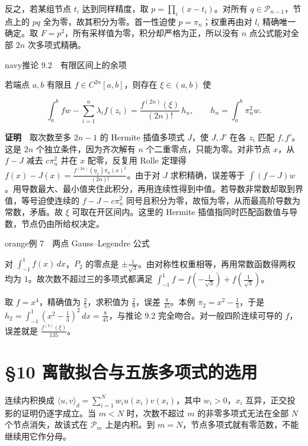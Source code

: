 \documentclass[11pt,a4paper]{article}
\newcommand{\lectureheading}[1]{\section{#1}}
\begin{document}
反之，若某组节点 \(t_i\) 达到同样精度，取 \(p=\prod_i(x-t_i)\)。对所有 \(q\in\mathcal P_{n-1}\)，节点上的 \(pq\) 全为零，故其积分为零。首一性迫使 \(p=\pi_n\)；权重再由对 \(l_i\) 精确唯一确定。取 \(F=p^2\)，所有采样值为零，积分却严格为正，所以没有 \(n\) 点公式能对全部 \(2n\) 次多项式精确。

\begin{sboxenv}{navy}{推论 9.2　有限区间上的余项}

若端点 \(a,b\) 有限且 \(f\in C^{2n}[a,b]\)，则存在 \(\xi\in(a,b)\) 使

\[
\int_a^b fw-\sum_{i=1}^n\lambda_if(z_i)
=\frac{f^{(2n)}(\xi)}{(2n)!}\,h_n,\qquad h_n=\int_a^b\pi_n^2w .
\]

\end{sboxenv}

\textbf{证明}　取次数至多 \(2n-1\) 的 Hermite 插值多项式 \(J\)，使 \(J,J'\) 在各 \(z_i\) 匹配 \(f,f'\)。这是 \(2n\) 个独立条件，因为齐次解有 \(n\) 个二重零点，只能为零。对非节点 \(x\)，从 \(f-J\) 减去 \(c\pi_n^2\) 并在 \(x\) 配零，反复用 Rolle 定理得 \(f(x)-J(x)=\frac{f^{(2n)}(\eta_x)\pi_n(x)^2}{(2n)!}\)。由于对 \(J\) 求积精确，误差等于 \(\int (f-J)w\)。用导数最大、最小值夹住此积分，再用连续性得到中值。若导数非常数却取到界值，等号迫使连续的 \(f-J-c\pi_n^2\) 同号且积分为零，故恒为零，从而最高阶导数为常数，矛盾。故 \(\xi\) 可取在开区间内。这里的 Hermite 插值指同时匹配函数值与导数，节点仍由所给权决定。

\begin{sboxenv}{orange}{例 7　两点 Gauss--Legendre 公式}

对 \(\int_{-1}^{1} f(x)\,dx\)，\(P_2\) 的零点是 \(\pm\frac{1}{\sqrt3}\)。由对称性权重相等，再用常数函数得两权均为 \(1\)。故次数不超过三的多项式都满足 \(\int_{-1}^1 f=f(-\frac{1}{\sqrt3})+f(\frac{1}{\sqrt3})\)。

\end{sboxenv}

取 \(f=x^4\)，精确值为 \(\frac{2}{5}\)，求积值为 \(\frac{2}{9}\)，误差 \(\frac{8}{45}\)。本例 \(\pi_2=x^2-\frac{1}{3}\)，于是 \(h_2=\int_{-1}^1(x^2-\frac{1}{3})^2\,dx=\frac{8}{45}\)，与推论 9.2 完全吻合。对一般四阶连续可导的 \(f\)，误差就是 \(\frac{f^{(4)}(\xi)}{135}\)。

\clearpage\lectureheading{§10 离散拟合与五族多项式的选用}

连续内积换成 \(\langle u,v\rangle_d=\sum_{i=1}^N w_i u(x_i)v(x_i)\)，其中 \(w_i>0\)，\(x_i\) 互异，正交投影的证明仍逐字成立。当 \(m<N\) 时，次数不超过 \(m\) 的非零多项式无法在全部 \(N\) 个节点消失，故该式在 \(\mathcal P_m\) 上是内积。到 \(m=N\)，节点多项式就有零范数，不能继续用它作分母。
\end{document}
